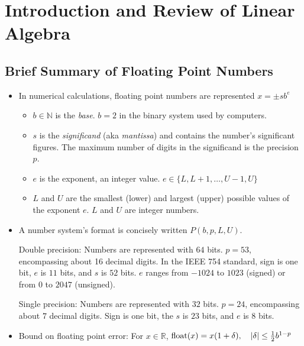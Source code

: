 \documentclass[11pt, a4paper]{article}
\newcommand{\R}{\mathbb{R}} %
\begin{document}
\newpage

\tableofcontents

\newpage

\pagestyle{headerstyle}

\section{Introduction and Review of Linear Algebra}

\subsection{Brief Summary of Floating Point Numbers}
\begin{itemize}
	\item In numerical calculations, floating point numbers are represented $ x = \pm s b^{e} $
	\begin{itemize}
		\item $ b \in \mathbb{N}$ is the \textit{base}. $ b = 2 $ in the binary system used by computers.
		\item $ s $ is the \textit{significand} (aka \textit{mantissa}) and contains the number's significant figures. The maximum number of digits in the significand is the precision $ p $.

		\item $ e $ is the exponent, an integer value. $ e \in \{L, L+1, \dots, U-1, U \} $
		
		\item $ L $ and $ U $ are the smallest (lower) and largest (upper) possible values of the exponent $ e $. $ L $ and $ U $ are integer numbers.
	\end{itemize}
	
	\item A number system's format is concisely written $ P(b, p, L, U) $. 
	
	Double precision: Numbers are represented with $ 64 $ bits. $ p = 53 $, encompassing about 16 decimal digits. In the IEEE 754 standard, sign is one bit, $ e $ is $ 11 $ bits, and $ s $ is $ 52 $ bits. $ e $ ranges from $ -1024 $ to $ 1023 $ (signed) or from $ 0 $ to $ 2047 $ (unsigned).
	
	Single precision: Numbers are represented with $ 32 $ bits.	$ p = 24 $, encompassing about $ 7 $ decimal digits. Sign is one bit, the $ s $ is $ 23 $ bits, and $ e $ is 8 bits.
	
	\item Bound on floating point error: For $ x \in \R $, $ \operatorname{float}(x) = x(1 + \delta), \quad \abs{\delta} \leq \frac{1}{2} b^{1-p} $
\end{itemize}
\end{document}
